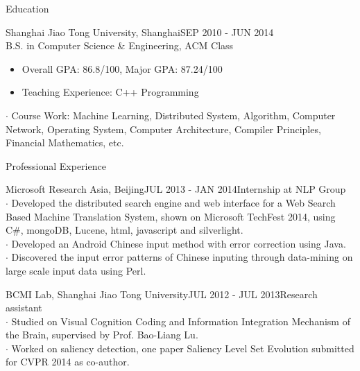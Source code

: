 \documentclass{resume} %
\begin{document}

\begin{rSection}{Education}

\begin{rSubsection}{Shanghai Jiao Tong University, Shanghai}{SEP 2010 - JUN 2014}{}\\
B.S. in Computer Science \& Engineering, ACM Class 
\begin{itemize}
\item Overall GPA: 86.8/100, Major GPA: 87.24/100
\item Teaching Experience: C++ Programming
\end{itemize}
$\cdot$ Course Work: Machine Learning, Distributed System, Algorithm, Computer Network, Operating System, Computer Architecture, Compiler Principles, Financial Mathematics, etc.
\end{rSubsection}

\end{rSection}


\begin{rSection}{Professional Experience}

\begin{rSubsection}{Microsoft Research Asia, Beijing}{JUL 2013 - JAN 2014}{Internship at NLP Group}
\\ $\cdot$ Developed the distributed search engine and web interface for a Web Search Based Machine Translation System, shown on Microsoft TechFest 2014, using C\#, mongoDB, Lucene, html, javascript and silverlight.
\\ $\cdot$ Developed an Android Chinese input method with error correction using Java. 
\\ $\cdot$ Discovered the input error patterns of Chinese inputing through data-mining on large scale input data using Perl.
\end{rSubsection}

\begin{rSubsection}{BCMI Lab, Shanghai Jiao Tong University}{JUL 2012 - JUL 2013}{Research assistant}
\\ $\cdot$ Studied on Visual Cognition Coding and Information Integration Mechanism of the Brain, supervised by Prof. Bao-Liang Lu.
\\ $\cdot$ Worked on saliency detection, one paper Saliency Level Set Evolution submitted for CVPR 2014 as co-author.
\end{rSubsection}

\end{rSection}
\end{document}
